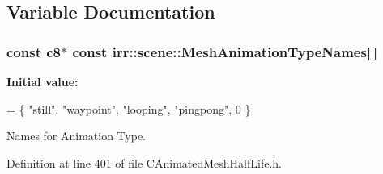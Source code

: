\subsection{Variable Documentation}
\hypertarget{namespaceirr_1_1scene_a3b848c92b179417c979c6d695fba9e93}{
\subsubsection[{Mesh\-Animation\-Type\-Names}]{\setlength{\rightskip}{0pt plus 5cm}const c8$\ast$ const irr\-::scene\-::\-Mesh\-Animation\-Type\-Names\mbox{[}$\,$\mbox{]}}}\label{namespaceirr_1_1scene_a3b848c92b179417c979c6d695fba9e93}
{\bfseries Initial value\-:}
\begin{DoxyCode}
=
    \{
        \textcolor{stringliteral}{"still"},
        \textcolor{stringliteral}{"waypoint"},
        \textcolor{stringliteral}{"looping"},
        \textcolor{stringliteral}{"pingpong"},
        0
    \}
\end{DoxyCode}


Names for Animation Type. 



Definition at line 401 of file C\-Animated\-Mesh\-Half\-Life.\-h.

